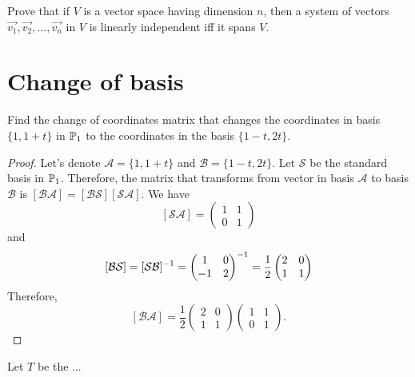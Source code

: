 \begin{exercise}
  Prove that if $V$ is a vector space having dimension $n$, then
  a system of vectors $\vec{v_1},\vec{v_2},\dots,\vec{v_n}$ in $V$
  is linearly independent iff it spans $V$.
\end{exercise}
\section{Change of basis}
\setcounter{exercise}{2}

\begin{exercise}
  Find the change of coordinates matrix that changes the 
  coordinates in basis $\{1,1+t\}$ in $\P_1$ to the 
  coordinates in the basis $\{1-t, 2t\}$.
\end{exercise}
\begin{proof}
  Let's denote $\mathcal{A}=\{1,1+t\}$ and 
  $\mathcal{B}=\{1-t, 2t\}$. Let $\mathcal{S}$
  be the standard basis in $\P_1$. Therefore, 
  the matrix that transforms from vector in basis
  $\mathcal{A}$ to basis $\mathcal{B}$ is 
  $[\mathcal{BA}]= [\mathcal{BS}][\mathcal{SA}]$.
  We have
  \[ [\mathcal{SA}] = \begin{pmatrix} 1 &1 \\ 0 &1 \end{pmatrix} \]
  and 
  \[
    [\mathcal{BS}]=[\mathcal{SB}]\inv=
    \begin{pmatrix} 1  & 0\\ -1 & 2 \end{pmatrix}\inv=\frac{1}{2}
    \begin{pmatrix} 2 &0\\ 1 &1 \end{pmatrix}
  \]
  Therefore, 
  \[
    [\mathcal{BA}]= \frac{1}{2}
    \begin{pmatrix} 2 &0\\ 1 &1 \end{pmatrix}
    \begin{pmatrix} 1 &1 \\ 0 &1 \end{pmatrix}.
  \]
\end{proof}
\begin{exercise}
  Let $T$ be the ...
\end{exercise}
